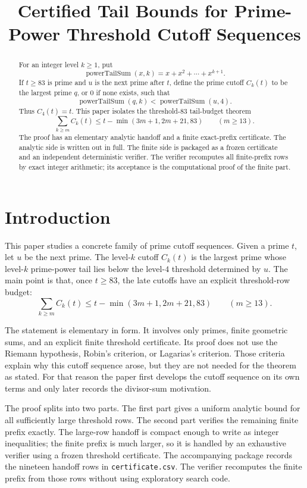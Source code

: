 \documentclass[11pt]{article}
\title{Certified Tail Bounds for Prime-Power Threshold Cutoff Sequences}
\author{}
\date{}
\newcommand{\Pow}{\operatorname{powerTailSum}}
\begin{document}
\maketitle

\begin{abstract}
For an integer level \(k\ge 1\), put
\[
  \Pow(x,k)=x+x^2+\cdots+x^{k+1}.
\]
If \(t\ge83\) is prime and \(u\) is the next prime after \(t\), define
the prime cutoff \(C_k(t)\) to be the largest prime \(q\), or \(0\) if none
exists, such that
\[
  \Pow(q,k)<\Pow(u,4).
\]
Thus \(C_4(t)=t\).  This paper isolates the threshold-\(83\)
tail-budget theorem
\[
  \sum_{k\ge m} C_k(t)
  \le
  t-\min(3m+1,2m+21,83)
  \qquad (m\ge13).
\]
The proof has an elementary analytic handoff and a finite exact-prefix
certificate.  The analytic side is written out in full.  The finite side is
packaged as a frozen certificate and an independent deterministic verifier.
The verifier recomputes all finite-prefix rows by exact integer arithmetic;
its acceptance is the computational proof of the finite part.
\end{abstract}

\section{Introduction}

This paper studies a concrete family of prime cutoff sequences.  Given a
prime \(t\), let \(u\) be the next prime.  The level-\(k\) cutoff \(C_k(t)\)
is the largest prime whose level-\(k\) prime-power tail lies below the
level-\(4\) threshold determined by \(u\).  The main point is that, once
\(t\ge83\), the late cutoffs have an explicit threshold-row budget:
\[
  \sum_{k\ge m} C_k(t)
  \le
  t-\min(3m+1,2m+21,83)
  \qquad (m\ge13).
\]

The statement is elementary in form.  It involves only primes, finite
geometric sums, and an explicit finite threshold certificate.  Its proof does not use
the Riemann hypothesis, Robin's criterion, or Lagarias's criterion.  Those
criteria explain why this cutoff sequence arose, but they are not needed for
the theorem as stated.  For that reason the paper first develops the cutoff
sequence on its own terms and only later records the divisor-sum motivation.

The proof splits into two parts.  The first part gives a uniform analytic
bound for all sufficiently large threshold rows.  The second part verifies
the remaining finite prefix exactly.  The large-row handoff is compact enough
to write as integer inequalities; the finite prefix is much larger, so it is
handled by an exhaustive verifier using a frozen threshold certificate.  The
accompanying package records the nineteen handoff rows in
\texttt{certificate.csv}.  The verifier recomputes the finite prefix from those
rows without using exploratory search code.
\end{document}

